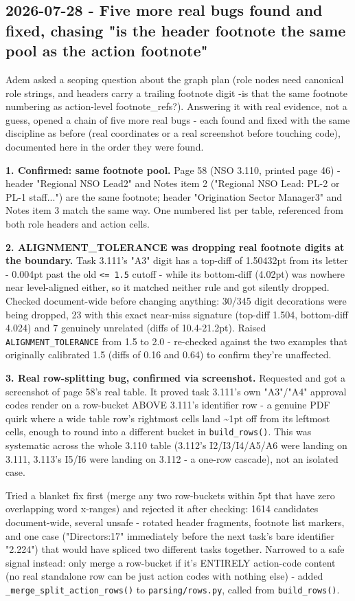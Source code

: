 \subsection*{2026-07-28 - Five more real bugs found and fixed, chasing "is the header footnote the same pool as the action footnote"}
Adem asked a scoping question about the graph plan (role nodes need canonical role strings, and headers carry a trailing footnote digit -is that the same footnote numbering as action-level footnote\_refs?). Answering it with real evidence, not a guess, opened a chain of five more real bugs - each found and fixed with the same discipline as before (real coordinates or a real screenshot before touching code), documented here in the order they were found.

\textbf{1. Confirmed: same footnote pool.} Page 58 (NSO 3.110, printed page 46) - header "Regional NSO Lead2" and Notes item 2 ("Regional NSO Lead: PL-2 or PL-1 staff...") are the same footnote; header "Origination Sector Manager3" and Notes item 3 match the same way. One numbered list per table, referenced from both role headers and action cells.

\textbf{2. ALIGNMENT\_TOLERANCE was dropping real footnote digits at the boundary.} Task 3.111's "A3" digit has a top-diff of 1.50432pt from its letter - 0.004pt past the old \texttt{<= 1.5} cutoff - while its bottom-diff (4.02pt) was nowhere near level-aligned either, so it matched neither rule and got silently dropped. Checked document-wide before changing anything: 30/345 digit decorations were being dropped, 23 with this exact near-miss signature (top-diff 1.504, bottom-diff 4.024) and 7 genuinely unrelated (diffs of 10.4-21.2pt). Raised \texttt{ALIGNMENT\_\allowbreak{}TOLERANCE} from 1.5 to 2.0 - re-checked against the two examples that originally calibrated 1.5 (diffs of 0.16 and 0.64) to confirm they're unaffected.

\textbf{3. Real row-splitting bug, confirmed via screenshot.} Requested and got a screenshot of page 58's real table. It proved task 3.111's own "A3"/"A4" approval codes render on a row-bucket ABOVE 3.111's identifier row - a genuine PDF quirk where a wide table row's rightmost cells land \textasciitilde{}1pt off from its leftmost cells, enough to round into a different bucket in \texttt{build\_\allowbreak{}rows()}. This was systematic across the whole 3.110 table (3.112's I2/I3/I4/A5/A6 were landing on 3.111, 3.113's I5/I6 were landing on 3.112 - a one-row cascade), not an isolated case.

Tried a blanket fix first (merge any two row-buckets within 5pt that have zero overlapping word x-ranges) and rejected it after checking: 1614 candidates document-wide, several unsafe - rotated header fragments, footnote list markers, and one case ("Directors:17" immediately before the next task's bare identifier "2.224") that would have spliced two different tasks together. Narrowed to a safe signal instead: only merge a row-bucket if it's ENTIRELY action-code content (no real standalone row can be just action codes with nothing else) - added \texttt{\_\allowbreak{}merge\_\allowbreak{}split\_\allowbreak{}action\_\allowbreak{}rows()} to \texttt{parsing/\allowbreak{}rows.py}, called from \texttt{build\_\allowbreak{}rows()}.

